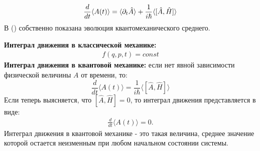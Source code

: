 \documentclass[__main__.tex]{subfiles}
\begin{document}
\begin{gather}
\llabel{_30:final}
\frac{d}{dt}\langle A(t) \rangle = \langle \partial_{t}\hat{A} \rangle + \frac{1}{i\hbar}\langle [\hat{A},\hat{H}] \rangle
\end{gather}
В () собственно показана эволюция квантомеханического среднего.

\textbf{Интеграл движения в классической механике:}
\begin{gather*}
f(q,p,t) = const
\end{gather*}
\textbf{Интеграл движения в квантовой механике:} если нет явной зависимости физической величины $A$ от времени, то:
$$
\frac{d}{dt}\langle A(t) \rangle =\frac{1}{i\hbar}\langle [\hat{A},\hat{H}] \rangle
$$
Если теперь выясняется, что $ [\hat{A},\hat{H}]=0$, то интеграл движения представляется в виде:
\begin{gather*}
\frac{d}{dt}\langle A(t) \rangle=0.
\end{gather*}
Интеграл движения в квантовой механике - это такая величина, среднее значение которой остается неизменным при любом начальном состоянии системы.
\end{document}
